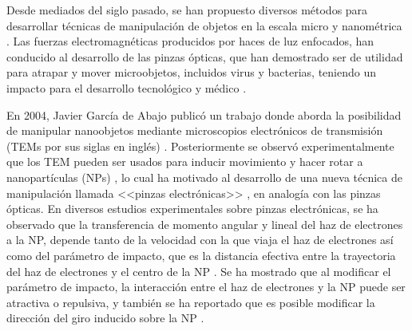 
Desde mediados del siglo pasado, se han propuesto diversos métodos para desarrollar técnicas de manipulación de objetos en la escala micro y nanométrica \cite{ashkin1970acceleration, ashkin1987optical, Ashkin, custance2009atomic, dholakia2011shaping, marago2013optical, romo2020controlled}. Las fuerzas electromagnéticas producidos por haces de luz enfocados, han conducido al desarrollo de las pinzas ópticas, que han demostrado ser de utilidad para atrapar y mover microobjetos, incluidos virus y bacterias, teniendo un impacto para el desarrollo tecnológico y médico \cite{ashkin1970acceleration, ashkin1987optical, Ashkin}.  

En 2004, Javier García de Abajo publicó un trabajo donde aborda la posibilidad de manipular nanoobjetos mediante microscopios electrónicos de transmisión (TEMs por sus siglas en inglés) \cite{GarciadeAbajo0}. Posteriormente se observó experimentalmente que los TEM pueden ser usados para inducir movimiento y hacer rotar a nanopartículas (NPs) \cite{Batson01, zheng2012electron}, lo cual ha motivado al desarrollo de una nueva técnica de manipulación llamada <<pinzas electrónicas>> \cite{Batson, oleshko2005electron, Oleshko}, en analogía con las pinzas ópticas. En diversos estudios experimentales sobre pinzas electrónicas, se ha observado que la transferencia de momento angular y lineal del haz de electrones a la NP, depende tanto de la velocidad con la que viaja el haz de electrones así como del parámetro de impacto, que es la distancia efectiva entre la trayectoria del haz de electrones y el centro de la NP \cite{OLESHKO2013203, Oleshko, Batson, Batson01, zheng2012electron, xu2010transmission}.  Se ha mostrado que al modificar el parámetro de impacto, la interacción entre el haz de electrones y la NP puede ser atractiva o repulsiva, y también se ha reportado que es posible modificar la dirección del giro inducido sobre la NP \cite{OLESHKO2013203, Batson, Oleshko}. 

